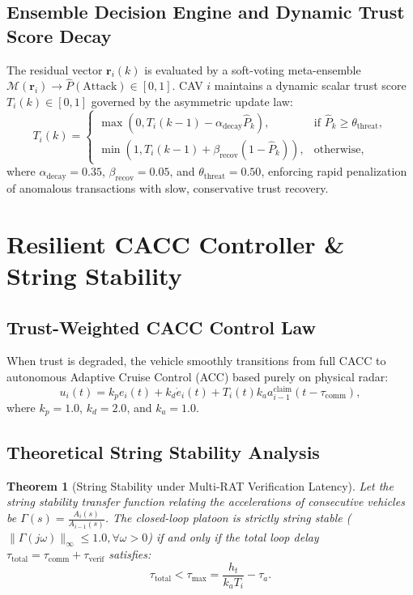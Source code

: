 \documentclass[journal]{IEEEtran}
\newtheorem{theorem}{Theorem}
\begin{document}
\subsection{Ensemble Decision Engine and Dynamic Trust Score Decay}
The residual vector $\mathbf{r}_i(k)$ is evaluated by a soft-voting meta-ensemble $\mathcal{M}(\mathbf{r}_i) \to \hat{P}(\text{Attack}) \in [0, 1]$. CAV $i$ maintains a dynamic scalar trust score $T_i(k) \in [0, 1]$ governed by the asymmetric update law:
\begin{equation}
    T_i(k) = 
    \begin{cases}
        \max(0, T_i(k-1) - \alpha_{\text{decay}} \hat{P}_k), & \text{if } \hat{P}_k \ge \theta_{\text{threat}}, \\
        \min(1, T_i(k-1) + \beta_{\text{recov}} (1 - \hat{P}_k)), & \text{otherwise},
    \end{cases}
    \label{eq:trust_update}
\end{equation}
where $\alpha_{\text{decay}} = 0.35$, $\beta_{\text{recov}} = 0.05$, and $\theta_{\text{threat}} = 0.50$, enforcing rapid penalization of anomalous transactions with slow, conservative trust recovery.

\section{Resilient CACC Controller \& String Stability}

\subsection{Trust-Weighted CACC Control Law}
When trust is degraded, the vehicle smoothly transitions from full CACC to autonomous Adaptive Cruise Control (ACC) based purely on physical radar:
\begin{equation}
    u_i(t) = k_p e_i(t) + k_d \dot{e}_i(t) + T_i(t) k_a a_{i-1}^{\text{claim}}(t - \tau_{\text{comm}}),
    \label{eq:cacc_law}
\end{equation}
where $k_p = 1.0$, $k_d = 2.0$, and $k_a = 1.0$.

\subsection{Theoretical String Stability Analysis}

\begin{theorem}[String Stability under Multi-RAT Verification Latency]
Let the string stability transfer function relating the accelerations of consecutive vehicles be $\Gamma(s) = \frac{A_i(s)}{A_{i-1}(s)}$. The closed-loop platoon is strictly string stable ($\|\Gamma(j\omega)\|_\infty \le 1.0, \forall \omega > 0$) if and only if the total loop delay $\tau_{\text{total}} = \tau_{\text{comm}} + \tau_{\text{verif}}$ satisfies:
\begin{equation}
    \tau_{\text{total}} < \tau_{\max} = \frac{h_t}{k_a T_i} - \tau_a.
    \label{eq:deadline}
\end{equation}
\end{theorem}
\end{document}
